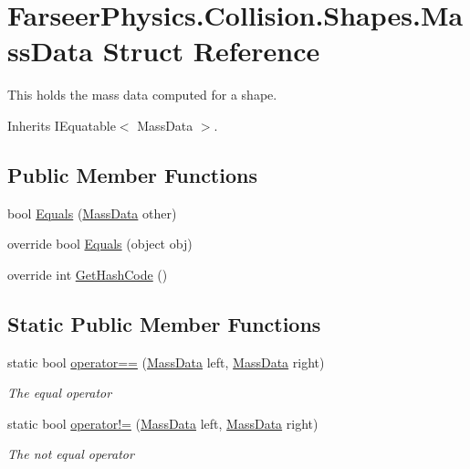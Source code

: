 \hypertarget{struct_farseer_physics_1_1_collision_1_1_shapes_1_1_mass_data}{\section{Farseer\+Physics.\+Collision.\+Shapes.\+Mass\+Data Struct Reference}
\label{struct_farseer_physics_1_1_collision_1_1_shapes_1_1_mass_data}
}


This holds the mass data computed for a shape.  




Inherits I\+Equatable$<$ Mass\+Data $>$.

\subsection*{Public Member Functions}
\begin{DoxyCompactItemize}
\item 
bool \hyperlink{struct_farseer_physics_1_1_collision_1_1_shapes_1_1_mass_data_af0d635061025b1b7841fa631a4a8b128}{Equals} (\hyperlink{struct_farseer_physics_1_1_collision_1_1_shapes_1_1_mass_data}{Mass\+Data} other)
\item 
override bool \hyperlink{struct_farseer_physics_1_1_collision_1_1_shapes_1_1_mass_data_ad767febeab754430b8ab2bfe6c0cd7b1}{Equals} (object obj)
\item 
override int \hyperlink{struct_farseer_physics_1_1_collision_1_1_shapes_1_1_mass_data_a989110e1dca2b1cb9842beed83750082}{Get\+Hash\+Code} ()
\end{DoxyCompactItemize}
\subsection*{Static Public Member Functions}
\begin{DoxyCompactItemize}
\item 
static bool \hyperlink{struct_farseer_physics_1_1_collision_1_1_shapes_1_1_mass_data_a0196b3cc0234ced813d4792f71584950}{operator==} (\hyperlink{struct_farseer_physics_1_1_collision_1_1_shapes_1_1_mass_data}{Mass\+Data} left, \hyperlink{struct_farseer_physics_1_1_collision_1_1_shapes_1_1_mass_data}{Mass\+Data} right)
\begin{DoxyCompactList}\small\item\em The equal operator \end{DoxyCompactList}\item 
static bool \hyperlink{struct_farseer_physics_1_1_collision_1_1_shapes_1_1_mass_data_ae55b2ca2cb194e9d32467dfa800b6fa2}{operator!=} (\hyperlink{struct_farseer_physics_1_1_collision_1_1_shapes_1_1_mass_data}{Mass\+Data} left, \hyperlink{struct_farseer_physics_1_1_collision_1_1_shapes_1_1_mass_data}{Mass\+Data} right)
\begin{DoxyCompactList}\small\item\em The not equal operator \end{DoxyCompactList}\end{DoxyCompactItemize}
